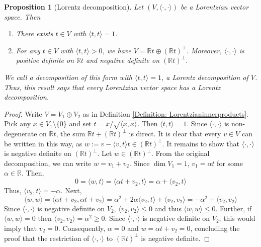 \documentclass[a4paper,11pt]{article}
\numberwithin{equation}{section}
\theoremstyle{definition}
\theoremstyle{plain}
\newtheorem{Proposition}[Definition]{Proposition}
\newcommand{\R}{\mathbb R}
\newcommand{\inner}[2]{\langle #1, #2 \rangle}
\begin{document}
\begin{Proposition}[Lorentz decomposition]\label{Prop: lorentz decomposition}
    Let $(V,\inner{\cdot}{\cdot})$ be a Lorentzian vector space. Then
    \begin{enumerate}
        \item There exists $t \in V$ with $\inner{t}{t} = 1$.
        \item For any $t \in V$ with $\inner{t}{t} > 0$, we have $V = \R t \oplus (\R t)^{\perp}$. Moreover, $\inner{\cdot}{\cdot}$ is positive definite on $\R t$ and negative definite on $(\R t)^{\perp}$. 
    \end{enumerate}
    We call a decomposition of this form with $\inner{t}{t} = 1$, a \textit{Lorentz} decomposition of $V$. Thus, this result says that every Lorentzian vector space has a Lorentz decomposition.
\end{Proposition}
\begin{proof}
    Write $V = V_{1} \oplus V_{2}$ as in Definition \ref{Definition: Lorentzianinnerproducts}. Pick any $x \in V_{1} \setminus \{0\}$ and set $t = x/\sqrt{\inner{x}{x}}$. Then $\inner{t}{t} = 1$. Since $\inner{\cdot}{\cdot}$ is non-degenerate on $\R t$, the sum $\R t + (\R t)^{\perp}$ is direct. It is clear that every $v \in V$ can be written in this way, as $w:= v - \inner{v}{t}t \in (\R t)^\perp$. It remains to show that $\inner{\cdot}{\cdot}$ is negative definite on $(\R t)^{\perp}$. Let $w \in (\R t)^{\perp}$. From the original decomposition, we can write $w = v_{1} + v_{2}$. Since $\dim V_{1} = 1$, $v_{1} = \alpha t$ for some $\alpha \in \R$. Then,
    $$0 = \inner{w}{t} = \inner{\alpha t + v_{2}}{t} = \alpha + \inner{v_{2}}{t}$$ Thus, $\inner{v_{2}}{t} = -\alpha$. Next,
    $$\inner{w}{w} = \inner{\alpha t + v_{2}}{\alpha t + v_{2}} = \alpha^{2} + 2\alpha \inner{v_{2}}{t} + \inner{v_{2}}{v_{2}} = -\alpha^{2} + \inner{v_{2}}{v_{2}}$$
    Since $\inner{\cdot}{\cdot}$ is negative definite on $V_{2}$, $\inner{v_2}{v_2}\leq 0$ and thus $\inner{w}{w} \leq 0$. Further, if $\inner{w}{w} = 0$ then $\inner{v_{2}}{v_{2}} = \alpha^{2} \geq 0$. Since $\inner{\cdot}{\cdot}$ is negative definite on $V_{2}$, this would imply that $v_{2} = 0$. Consequently, $\alpha = 0$ and $w = \alpha t + v_{2} = 0$, concluding the proof that the restriction of $\inner{\cdot}{\cdot}$ to $(\R t)^\perp$ is negative definite.
\end{proof}
\end{document}
